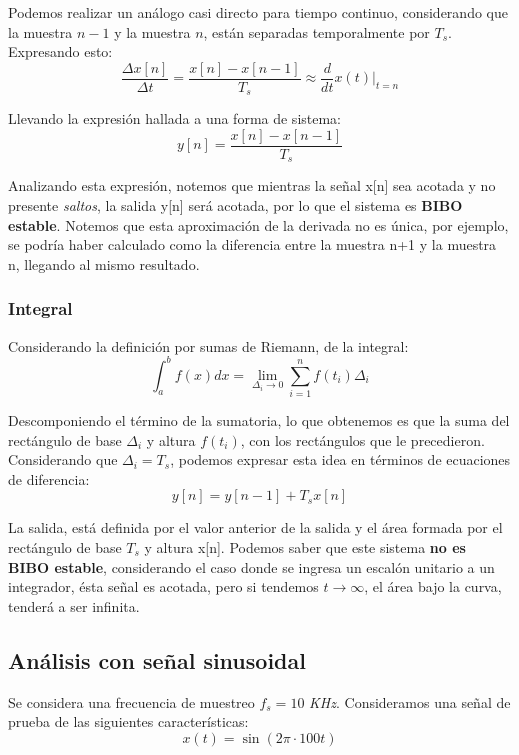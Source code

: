 			Podemos realizar un análogo casi directo para tiempo continuo, considerando que la muestra $n-1$ y la muestra $n$, están separadas temporalmente por $T_{s}$. Expresando esto:
			\begin{equation}
				\frac{\Delta x[n]}{\Delta t} = \frac{x[n] - x[n-1]}{T_{s}} \approx \frac{d}{dt}x(t) |_{t = n}
			\end{equation}
			
			Llevando la expresión hallada a una forma de sistema:
			\begin{equation}
				\boxed{y[n] = \frac{x[n] - x[n-1]}{T_{s}}}
				\label{eq:derivative_S1}
			\end{equation}
			
			Analizando esta expresión, notemos que mientras la señal x[n] sea acotada y no presente \textit{saltos}, la salida y[n] será acotada, por lo que el sistema es \textbf{BIBO estable}. Notemos que esta aproximación de la derivada no es única, por ejemplo, se podría haber calculado como la diferencia entre la muestra n+1 y la muestra n, llegando al mismo resultado.
			
		\subsubsection{Integral}
			Considerando la definición por sumas de Riemann, de la integral:
			\begin{equation}
				\int_{a}^{b} f(x)dx =  \lim_{\Delta_{i} \rightarrow 0} \sum_{i = 1}^{n} f(t_{i}) \Delta_{i}
			\end{equation}			 
			
			Descomponiendo el término de la sumatoria, lo que obtenemos es que la suma del rectángulo de base $\Delta_{i}$ y altura $f(t_{i})$, con los rectángulos que le precedieron. Considerando que $\Delta_{i} = T_{s}$, podemos expresar esta idea en términos de ecuaciones de diferencia:
			\begin{equation}
				\boxed{y[n] = y[n-1] + T_{s}x[n]}
			\end{equation}
			
			La salida, está definida por el valor anterior de la salida y el área formada por el rectángulo de base $T_{s}$ y altura x[n]. Podemos saber que este sistema \textbf{no es BIBO estable}, considerando el caso donde se ingresa un escalón unitario a un integrador, ésta señal es acotada, pero si tendemos $t \rightarrow \infty$, el área bajo la curva, tenderá a ser infinita. 
			
	\subsection{Análisis con señal sinusoidal}
		Se considera una frecuencia de muestreo $f_{s} = 10$ \textit{KHz}. Consideramos una señal de prueba de las siguientes características:
		\begin{equation}
			x(t) =  \sin(2\pi\cdot 100 t)
		\end{equation}
		
